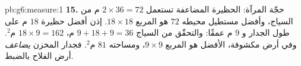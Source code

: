 \begin{solution}{pb:g6:measure:1}
\textbf{15.} حجّة المرآة: الحظيرة المضاعفة تستعمل
$2 \times 36 = 72$ م من السياج، وأفضل مستطيل
محيطه $72$ هو المربع $18 \times 18$. إذن أفضل حظيرة
$18$ م على طول الجدار و $9$ م عمقًا: والتحقّق من السياج
$9 + 18 + 9 = 36$ م،  $18 \times 9 = 162$ م$^2$. وفي أرض
مكشوفة، الأفضل هو المربع $9 \times 9$، ومساحته $81$ م$^2$.
فجدار المخزن \emph{يضاعف} أرض الفلاح بالضبط.
\end{solution}
